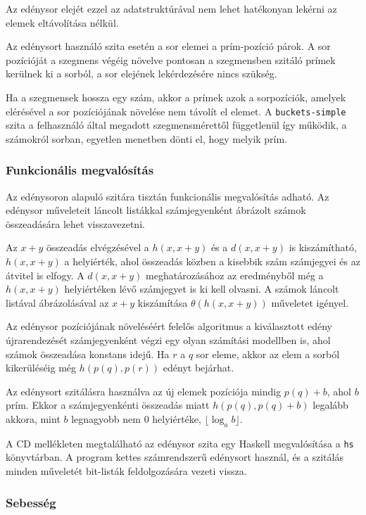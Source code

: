 Az edénysor elejét ezzel az adatstruktúrával nem lehet hatékonyan lekérni az elemek eltávolítása nélkül.

Az edénysort használó szita esetén a sor elemei a prím-pozíció párok.
A sor pozícióját a szegmens végéig növelve pontosan a szegmensben szitáló prímek kerülnek ki a sorból, a sor elejének lekérdezésére nincs szükség.

Ha a szegmensek hossza egy szám, akkor a prímek azok a sorpozíciók, amelyek elérésével a sor pozíciójának növelése nem távolít el elemet.
A \texttt{buckets-simple} szita a felhasználó által megadott szegmensmérettől függetlenül így működik, a számokról sorban, egyetlen menetben dönti el, hogy melyik prím.

\subsubsection{Funkcionális megvalósítás}

Az edénysoron alapuló szitára tisztán funkcionális megvalósítás adható.
Az edénysor műveleteit láncolt listákkal számjegyenként ábrázolt számok összeadására lehet visszavezetni.

Az $x+y$ összeadás elvégzésével a $h(x, x+y)$ és a $d(x, x+y)$ is kiszámítható, $h(x, x+y)$ a helyiérték, ahol összeadás közben a kisebbik szám számjegyei és az átvitel is elfogy. A $d(x, x+y)$ meghatározásához az eredményből még a $h(x, x+y)$ helyiértéken lévő számjegyet is ki kell olvasni.
A számok láncolt listával ábrázolásával az $x+y$ kiszámítása $\theta(h(x, x+y))$ műveletet igényel.

Az edénysor pozíciójának növeléséért felelős algoritmus a kiválasztott edény újrarendezését számjegyenként végzi egy olyan számítási modellben is, ahol számok összeadása konstans idejű.
Ha $r$ a $q$ sor eleme, akkor az elem a sorból kikerüléséig még $h(p(q), p(r))$ edényt bejárhat.

Az edénysort szitálásra használva az új elemek pozíciója mindig $p(q)+b$, ahol $b$ prím.
Ekkor a számjegyenkénti összeadás miatt $h(p(q), p(q)+b)$ legalább akkora, mint $b$ legnagyobb nem $0$ helyiértéke, $\lfloor \log_{a}{b} \rfloor$.

A CD mellékleten megtalálható az edénysor szita egy Haskell megvalósítása a \texttt{hs} könyvtárban.
A program kettes számrendszerű edénysort használ, és a szitálás minden műveletét bit-listák feldolgozására vezeti vissza.

\subsubsection{Sebesség}

